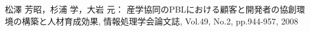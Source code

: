 \documentclass[a4j,9pt,twocolumn,twoside]{jsarticle}
\newcommand{\me}{中鉢 欣秀}
\begin{document}
\begin{thebibliography}{99}
		 松澤 芳昭，杉浦 学，大岩 元： 産学協同のPBLにおける顧客と開発者の協創環境の構築と人材育成効果, 情報処理学会論文誌,  Vol.49, No.2, pp.944-957, 2008
	\end{thebibliography}
\end{document}
